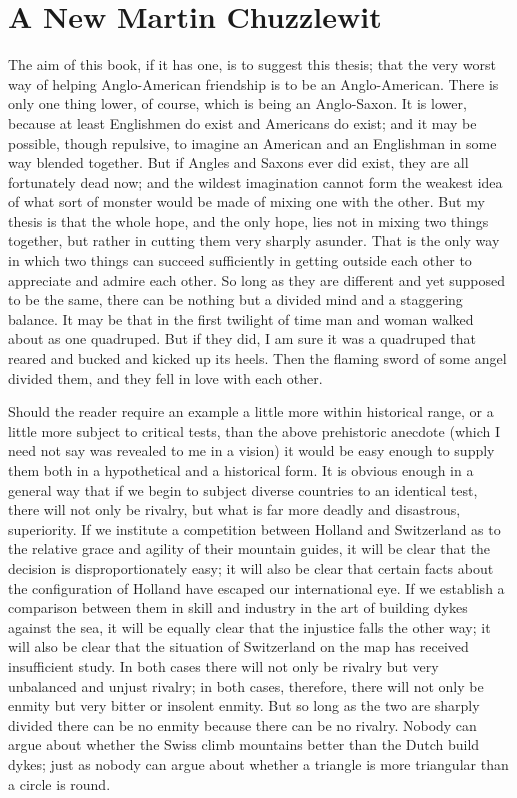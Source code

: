 \documentclass{book}
\begin{document}
\chapter{A New Martin Chuzzlewit}
\label{chapter-15}
The aim of this book, if it has one, is to suggest this thesis; that the very worst way of helping Anglo-American friendship is to be an Anglo-American. There is only one thing lower, of course, which is being an Anglo-Saxon. It is lower, because at least Englishmen do exist and Americans do exist; and it may be possible, though repulsive, to imagine an American and an Englishman in some way blended together. But if Angles and Saxons ever did exist, they are all fortunately dead now; and the wildest imagination cannot form the weakest idea of what sort of monster would be made of mixing one with the other. But my thesis is that the whole hope, and the only hope, lies not in mixing two things together, but rather in cutting them very sharply asunder. That is the only way in which two things can succeed sufficiently in getting outside each other to appreciate and admire each other. So long as they are different and yet supposed to be the same, there can be nothing but a divided mind and a staggering balance. It may be that in the first twilight of time man and woman walked about as one quadruped. But if they did, I am sure it was a quadruped that reared and bucked and kicked up its heels. Then the flaming sword of some angel divided them, and they fell in love with each other.

Should the reader require an example a little more within historical range, or a little more subject to critical tests, than the above prehistoric anecdote (which I need not say was revealed to me in a vision) it would be easy enough to supply them both in a hypothetical and a historical form. It is obvious enough in a general way that if we begin to subject diverse countries to an identical test, there will not only be rivalry, but what is far more deadly and disastrous, superiority. If we institute a competition between Holland and Switzerland as to the relative grace and agility of their mountain guides, it will be clear that the decision is disproportionately easy; it will also be clear that certain facts about the configuration of Holland have escaped our international eye. If we establish a comparison between them in skill and industry in the art of building dykes against the sea, it will be equally clear that the injustice falls the other way; it will also be clear that the situation of Switzerland on the map has received insufficient study. In both cases there will not only be rivalry but very unbalanced and unjust rivalry; in both cases, therefore, there will not only be enmity but very bitter or insolent enmity. But so long as the two are sharply divided there can be no enmity because there can be no rivalry. Nobody can argue about whether the Swiss climb mountains better than the Dutch build dykes; just as nobody can argue about whether a triangle is more triangular than a circle is round.
\end{document}
